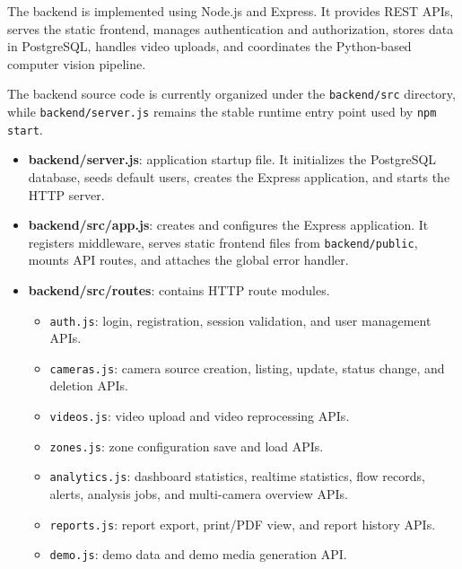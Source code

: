 \documentclass[12pt,a4paper]{report}
\begin{document}
The backend is implemented using Node.js and Express. It provides REST APIs, serves the static frontend, manages authentication and authorization, stores data in PostgreSQL, handles video uploads, and coordinates the Python-based computer vision pipeline.

The backend source code is currently organized under the \texttt{backend/src} directory, while \texttt{backend/server.js} remains the stable runtime entry point used by \texttt{npm start}.

\begin{itemize}
    \item \textbf{backend/server.js}: application startup file. It initializes the PostgreSQL database, seeds default users, creates the Express application, and starts the HTTP server.
    
    \item \textbf{backend/src/app.js}: creates and configures the Express application. It registers middleware, serves static frontend files from \texttt{backend/public}, mounts API routes, and attaches the global error handler.
    
    \item \textbf{backend/src/routes}: contains HTTP route modules.
    \begin{itemize}
        \item \texttt{auth.js}: login, registration, session validation, and user management APIs.
        \item \texttt{cameras.js}: camera source creation, listing, update, status change, and deletion APIs.
        \item \texttt{videos.js}: video upload and video reprocessing APIs.
        \item \texttt{zones.js}: zone configuration save and load APIs.
        \item \texttt{analytics.js}: dashboard statistics, realtime statistics, flow records, alerts, analysis jobs, and multi-camera overview APIs.
        \item \texttt{reports.js}: report export, print/PDF view, and report history APIs.
        \item \texttt{demo.js}: demo data and demo media generation API.
    \end{itemize}
    

\end{itemize}
\end{document}

